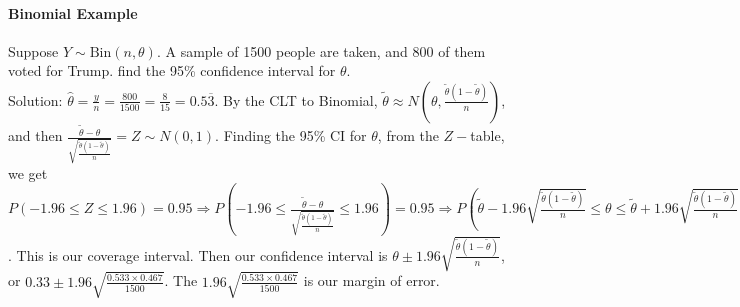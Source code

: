 \documentclass[10pt,letter]{article}
\theoremstyle{plain}
\theoremstyle{definition}
\begin{document}
\paragraph{Binomial Example}
Suppose $Y\sim\text{Bin}(n,\theta)$. A sample of 1500 people are taken, and 800 of them voted for Trump. find the 95\% confidence interval for $\theta$. \\ 
Solution: $\hat{\theta}=\frac{y}{n}=\frac{800}{1500}=\frac{8}{15}=0.5\overline{3}$. By the CLT to Binomial, $\tilde{\theta}\approx N\left(\theta,\frac{\tilde\theta(1-\tilde\theta)}{n}\right)$, and then $\frac{\tilde{\theta}-\theta}{\sqrt{\frac{\tilde{\theta}(1-\tilde{\theta})}{n}}}=Z\sim N(0,1)$. Finding the 95\% CI for $\theta$, from the $Z-$table, we get $P(-1.96\leq Z\leq1.96)=0.95\Rightarrow P\left(-1.96\leq\frac{\tilde{\theta}-\theta}{\sqrt{\frac{\tilde{\theta}(1-\tilde{\theta})}{n}}}\leq1.96\right)=0.95\Rightarrow P\left(\tilde{\theta}-1.96\sqrt{\frac{\tilde{\theta}(1-\tilde{\theta})}{n}}\leq\theta\leq\tilde{\theta}+1.96\sqrt{\frac{\tilde{\theta}(1-\tilde{\theta})}{n}}\right)=0.95$. This is our coverage interval. Then our confidence interval is $\theta\pm1.96\sqrt{\frac{\tilde{\theta}(1-\tilde{\theta})}{n}}$, or $0.33\pm1.96\sqrt{\frac{0.533\times0.467}{1500}}$. The $1.96\sqrt{\frac{0.533\times0.467}{1500}}$ is our margin of error.
\end{document}
